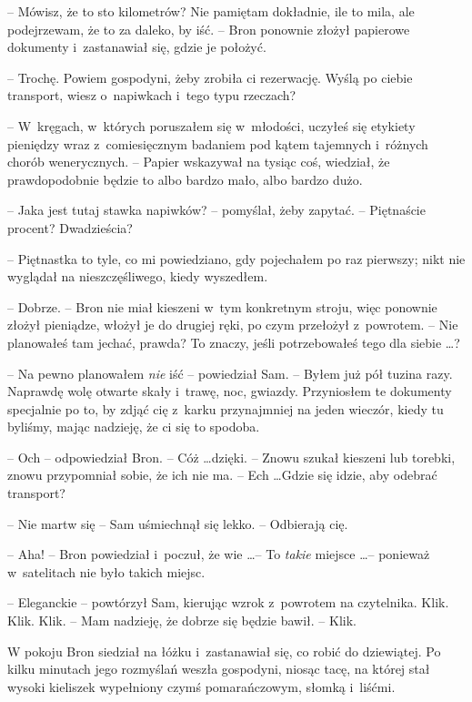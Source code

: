 \documentclass[oneside,polish,11pt,rmheadings]{mwbk}
\begin{document}
-- Mówisz, że to sto kilometrów? Nie pamiętam dokładnie, ile to mila, ale podejrzewam, że to za daleko, by iść. -- Bron ponownie złożył papierowe dokumenty i~zastanawiał się, gdzie je położyć. 

-- Trochę. Powiem gospodyni, żeby zrobiła ci rezerwację. Wyślą po ciebie transport, wiesz o~napiwkach i~tego typu rzeczach? 

-- W~kręgach, w~których poruszałem się w~młodości, uczyłeś się etykiety pieniędzy wraz z~comiesięcznym badaniem pod kątem tajemnych i~różnych chorób wenerycznych. -- Papier wskazywał na tysiąc coś, wiedział, że prawdopodobnie będzie to albo bardzo mało, albo bardzo dużo. 

-- Jaka jest tutaj stawka napiwków? -- pomyślał, żeby zapytać. -- Piętnaście procent? Dwadzieścia? 

-- Piętnastka to tyle, co mi powiedziano, gdy pojechałem po raz pierwszy; nikt nie wyglądał na nieszczęśliwego, kiedy wyszedłem. 

-- Dobrze. -- Bron nie miał kieszeni w~tym konkretnym stroju, więc ponownie złożył pieniądze, włożył je do drugiej ręki, po czym przełożył z~powrotem. -- Nie planowałeś tam jechać, prawda? To znaczy, jeśli potrzebowałeś tego dla siebie \ldots ? 

-- Na pewno planowałem \textit{nie} iść -- powiedział Sam.  -- Byłem już pół tuzina razy. Naprawdę wolę otwarte skały i~trawę, noc, gwiazdy. Przyniosłem te dokumenty specjalnie po to, by zdjąć cię z~karku przynajmniej na jeden wieczór, kiedy tu byliśmy, mając nadzieję, że ci się to spodoba. 

-- Och -- odpowiedział Bron. -- Cóż \ldots  dzięki. -- Znowu szukał kieszeni lub torebki, znowu przypomniał sobie, że ich nie ma. -- Ech \ldots   Gdzie się idzie, aby odebrać transport? 

-- Nie martw się -- Sam uśmiechnął się lekko. -- Odbierają cię. 

-- Aha! -- Bron powiedział i~poczuł, że wie \ldots  -- To \textit{takie }miejsce \ldots  -- ponieważ w~satelitach nie było takich miejsc. 

-- Eleganckie -- powtórzył Sam, kierując wzrok z~powrotem na czytelnika. Klik. Klik. Klik. -- Mam nadzieję, że dobrze się będzie bawił. -- Klik. 

W pokoju Bron siedział na łóżku i~zastanawiał się, co robić do dziewiątej. Po kilku minutach jego rozmyślań weszła gospodyni, niosąc tacę, na której stał wysoki kieliszek wypełniony czymś pomarańczowym, słomką i~liśćmi. 
\end{document}
